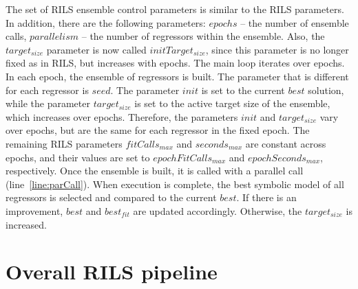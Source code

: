 \documentclass{article}
\begin{document}
The set of RILS ensemble control parameters is similar to the RILS parameters. In addition, there are the following parameters: $epochs$ -- the number of ensemble calls, $parallelism$ -- the number of regressors within the ensemble. Also, the $target_{size}$ parameter is now called $initTarget_{size}$, since this parameter is no longer fixed as in RILS, but increases with epochs.
The main loop iterates over epochs. In each epoch, the ensemble of regressors is built. The parameter that is different for each regressor is $seed$. The parameter $init$ is set to the current $best$ solution, while the parameter $target_{size}$ is set to the active target size of the ensemble, which increases over epochs. Therefore, the parameters $init$ and $target_{size}$ vary over epochs, but are the same for each regressor in the fixed epoch. The remaining RILS parameters $fitCalls_{max}$ and $seconds_{max}$ are constant across epochs, and their values are set to $epochFitCalls_{max}$ and $epochSeconds_{max}$, respectively. Once the ensemble is built, it is called with a parallel call (line~\ref{line:parCall}). When execution is complete, the best symbolic model of all regressors is selected and compared to the current $best$. If there is an improvement, $best$ and $best_{fit}$ are updated accordingly. Otherwise, the $target_{size}$ is increased.

\section{Overall RILS pipeline}\label{sec:rils-pipeline}
\end{document}
